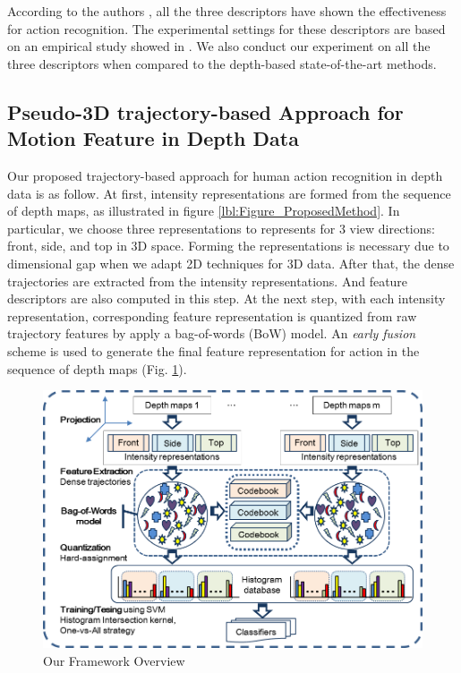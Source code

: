 \documentclass[review]{elsarticle}
\begin{document}
According to the authors \cite{laptev2008learning, wang2011densetraj, wang2009evaluation, liu2009recognizing}, all the three descriptors have shown the effectiveness for action recognition. The experimental settings for these descriptors are based on an empirical study showed in \cite{wang2011densetraj}. We also conduct our experiment on all the three descriptors when compared to the depth-based state-of-the-art methods.

\subsection{Pseudo-3D trajectory-based Approach for Motion Feature in Depth Data}

Our proposed trajectory-based approach for human action recognition in depth data is as follow. At first, intensity representations are formed from the sequence of depth maps, as illustrated in figure \ref{lbl:Figure_ProposedMethod}. In particular, we choose three representations to represents for 3 view directions: front, side, and top in 3D space. Forming the representations is necessary due to dimensional gap when we adapt 2D techniques for 3D data. After that, the dense trajectories are extracted from the intensity representations. And feature descriptors are also computed in this step. At the next step, with each intensity representation, corresponding feature representation is quantized from raw trajectory features by apply a bag-of-words (BoW) model. An \textit{early fusion} scheme is used to generate the final feature representation for action in the sequence of depth maps (Fig. \ref{lbl:Figure_Framework}).

\begin{figure}
	\centering
		\includegraphics[width=\textwidth]{Framework3D.png} %
	\caption{\label{lbl:Figure_Framework}Our Framework Overview}
\end{figure}
\end{document}
